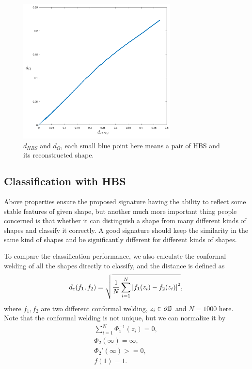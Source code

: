 \documentclass[review,onefignum,onetabnum]{siamonline190516}
\begin{document}
        \begin{figure}
            \begin{center}
                \includegraphics[width=8cm]{d_hbs_and_d_omega.png}
            \end{center}
            \caption{$d_{HBS}$ and $d_\Omega$, each small blue point here means a pair of HBS and its reconstructed shape.}
            \label{d_hbs and d_omega}
        \end{figure}

    \subsection{Classification with HBS}
        Above properties ensure the proposed signature having the ability to reflect some stable features of given shape, but another much more important thing people concerned is that whether it can distinguish a shape from many different kinds of shapes and classify it correctly. A good signature should keep the similarity in the same kind of shapes and be significantly different for different kinds of shapes.

        To compare the classification performance, we also calculate the conformal welding of all the shapes directly to classify, and the distance is defined as
        \begin{equation}\label{welding dis}
            d_c(f_1, f_2) = \sqrt{\frac{1}{N} \sum_{i=1}^N \abs{f_1(z_i) - f_2(z_i)}^2},
        \end{equation}
        where $f_1, f_2$ are two different conformal welding, $z_i \in \partial \mathbb{D}$ and $N=1000$ here. Note that the conformal welding is not unique, but we can normalize it by
        \begin{equation}
        \begin{split}\label{norm to cw}
            \sum_{i=1}^N \Phi_1^{-1}(z_i) = 0,\\
            \Phi_2(\infty) = \infty,\\
            \Phi_2'(\infty) >= 0,\\
            f(1) = 1.
        \end{split}
        \end{equation}
        
\end{document}
